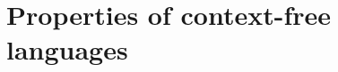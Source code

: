 

\setcounter{section}{7}
\setcounter{subsection}{1}
\setcounter{dfn}{0}

\section{Properties of context-free languages}

